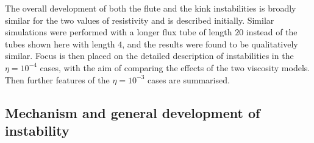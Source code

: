 \documentclass[fleqn,usenatbib]{mnras}
\begin{document}
The overall development of both the flute and the kink instabilities is broadly
similar for the two values of resistivity and is described  initially. Similar
simulations were performed with a longer flux tube of length $20$ instead of
the tubes shown here with length $4$, and the results were found to be
qualitatively similar. Focus is then placed on the detailed description of
instabilities in the $\eta=10^{-4}$ cases, with the aim of comparing the
effects of the two viscosity models. Then further features of the
$\eta=10^{-3}$ cases are summarised.

\subsection{Mechanism and
    general development of instability}
\end{document}
